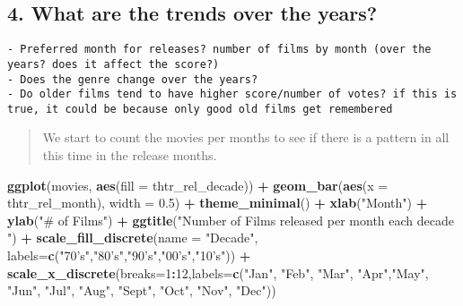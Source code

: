 \documentclass[]{article}
\newenvironment{Shaded}{\begin{snugshade}}{\end{snugshade}}
\newcommand{\KeywordTok}[1]{\textcolor[rgb]{0.13,0.29,0.53}{\textbf{#1}}}
\newcommand{\DataTypeTok}[1]{\textcolor[rgb]{0.13,0.29,0.53}{#1}}
\newcommand{\DecValTok}[1]{\textcolor[rgb]{0.00,0.00,0.81}{#1}}
\newcommand{\FloatTok}[1]{\textcolor[rgb]{0.00,0.00,0.81}{#1}}
\newcommand{\StringTok}[1]{\textcolor[rgb]{0.31,0.60,0.02}{#1}}
\newcommand{\OperatorTok}[1]{\textcolor[rgb]{0.81,0.36,0.00}{\textbf{#1}}}
\newcommand{\NormalTok}[1]{#1}
\begin{document}
\subsection{4. What are the trends over the
years?}\label{what-are-the-trends-over-the-years-1}

\begin{verbatim}
- Preferred month for releases? number of films by month (over the years? does it affect the score?)
- Does the genre change over the years?
- Do older films tend to have higher score/number of votes? if this is true, it could be because only good old films get remembered
\end{verbatim}

\begin{quote}
We start to count the movies per months to see if there is a pattern in
all this time in the release months.
\end{quote}

\begin{Shaded}
\begin{Highlighting}[]
\KeywordTok{ggplot}\NormalTok{(movies, }\KeywordTok{aes}\NormalTok{(}\DataTypeTok{fill =}\NormalTok{ thtr_rel_decade)) }\OperatorTok{+}\StringTok{ }\KeywordTok{geom_bar}\NormalTok{(}\KeywordTok{aes}\NormalTok{(}\DataTypeTok{x =}\NormalTok{ thtr_rel_month), }\DataTypeTok{width =} \FloatTok{0.5}\NormalTok{) }\OperatorTok{+}\StringTok{ }\KeywordTok{theme_minimal}\NormalTok{() }\OperatorTok{+}\StringTok{ }\KeywordTok{xlab}\NormalTok{(}\StringTok{"Month"}\NormalTok{) }\OperatorTok{+}\StringTok{ }\KeywordTok{ylab}\NormalTok{(}\StringTok{"# of Films"}\NormalTok{) }\OperatorTok{+}\StringTok{ }\KeywordTok{ggtitle}\NormalTok{(}\StringTok{"Number of Films released per month each decade "}\NormalTok{) }\OperatorTok{+}\StringTok{ }\KeywordTok{scale_fill_discrete}\NormalTok{(}\DataTypeTok{name =} \StringTok{"Decade"}\NormalTok{, }\DataTypeTok{labels=}\KeywordTok{c}\NormalTok{(}\StringTok{"70's"}\NormalTok{,}\StringTok{"80's"}\NormalTok{,}\StringTok{"90's"}\NormalTok{,}\StringTok{"00's"}\NormalTok{,}\StringTok{"10's"}\NormalTok{)) }\OperatorTok{+}\StringTok{ }\KeywordTok{scale_x_discrete}\NormalTok{(}\DataTypeTok{breaks=}\DecValTok{1}\OperatorTok{:}\DecValTok{12}\NormalTok{,}\DataTypeTok{labels=}\KeywordTok{c}\NormalTok{(}\StringTok{"Jan"}\NormalTok{, }\StringTok{"Feb"}\NormalTok{, }\StringTok{"Mar"}\NormalTok{, }\StringTok{"Apr"}\NormalTok{,}\StringTok{"May"}\NormalTok{, }\StringTok{"Jun"}\NormalTok{, }\StringTok{"Jul"}\NormalTok{, }\StringTok{"Aug"}\NormalTok{, }\StringTok{"Sept"}\NormalTok{, }\StringTok{"Oct"}\NormalTok{, }\StringTok{"Nov"}\NormalTok{, }\StringTok{"Dec"}\NormalTok{))}
\end{Highlighting}
\end{Shaded}
\end{document}
